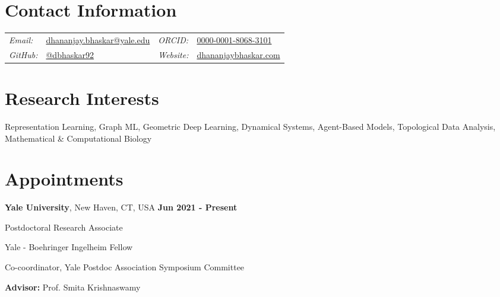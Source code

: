 \documentclass[margin,line]{res}
\newenvironment{list1}{
  \begin{list}{\ding{113}}{
      \setlength{\itemsep}{0in}
      \setlength{\parsep}{0in} \setlength{\parskip}{0in}
      \setlength{\topsep}{0in} \setlength{\partopsep}{0in}
      \setlength{\leftmargin}{0.17in}}}{\end{list}}
\begin{document}
\pagestyle{plain}


\begin{resume}

\vspace*{.2cm}

\section{\sc Contact Information}

\renewcommand{\arraystretch}{1.1}
\begin{tabular}{@{}p{1.8cm}p{6.3cm}p{2.1cm}p{4cm}}
{\it Email:} & \href{mailto:dhananjay.bhaskar@yale.edu}{dhananjay.bhaskar@yale.edu} & {\it ORCID:} & \href{https://orcid.org/0000-0001-8068-3101}{0000-0001-8068-3101} \\
{\it GitHub:} & \href{https://github.com/dbhaskar92}{@dbhaskar92} & {\it Website:} & \href{http://dhananjaybhaskar.com}{dhananjaybhaskar.com}
\end{tabular}

\vspace*{.05cm}

\section{\sc Research Interests} Representation Learning, Graph ML, Geometric Deep Learning, Dynamical Systems, 
Agent-Based Models, Topological Data Analysis, Mathematical \& Computational Biology

\vspace*{.05cm}

\section{\sc Appointments}

{\bf Yale University}, New Haven, CT, USA  \hfill {\bf Jun 2021 - Present}\\
\vspace*{-.2cm}
\begin{list1}
\setlength\itemsep{0.22em}
\item[] Postdoctoral Research Associate
\item[] Yale - Boehringer Ingelheim Fellow
\item[] Co-coordinator, Yale Postdoc Association Symposium Committee
\vspace*{.1cm}
\item[] {\bf Advisor:} Prof. Smita Krishnaswamy
\end{list1}


\end{resume}
\end{document}
